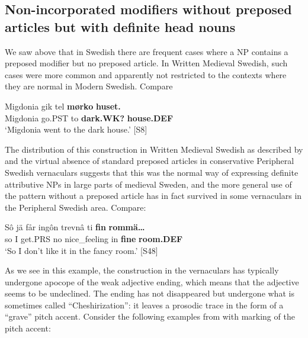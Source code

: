 
\subsection{Non-incorporated modifiers without preposed articles but with definite head nouns}
\label{bkm:Ref154984033}
We saw above that in Swedish there are frequent cases where a NP contains a preposed modifier but no preposed article. In Written Medieval Swedish, such cases were more common and apparently not restricted to the contexts where they are normal in Modern Swedish. Compare 


\ea\label{}
\gll Migdonia  gik  tel  \textbf{mørko} \textbf{huset.}\\
Migdonia  go.PST  to  \textbf{dark.WK?} \textbf{house.DEF}\\
\glt ‘Migdonia went to the dark house.’ [S8]
\z

The distribution of this construction in Written Medieval Swedish as described by \citet{Larm1936} and the virtual absence of standard preposed articles in conservative Peripheral Swedish vernaculars suggests that this was the normal way of expressing definite attributive NPs in large parts of medieval Sweden, and the more general use of the pattern without a preposed article has in fact survived in some vernaculars in the Peripheral Swedish area. Compare: 


\ea\label{}
\gll Sô  jä  får  ingôn  trevnâ  ti  \textbf{fin} \textbf{rommä…}\\
so  I  get.PRS  no  nice\_feeling  in  \textbf{fine} \textbf{room.DEF}\\
\glt ‘So I don’t like it in the fancy room.’ [S48]
\z

As we see in this example, the construction in the vernaculars has typically undergone apocope of the weak adjective ending, which means that the adjective seems to be undeclined. The ending has not disappeared but undergone what is sometimes called “Cheshirization”: it leaves a prosodic trace in the form of a “grave” pitch accent. Consider the following examples from \citet[148]{Levander1928} with marking of the pitch accent:

